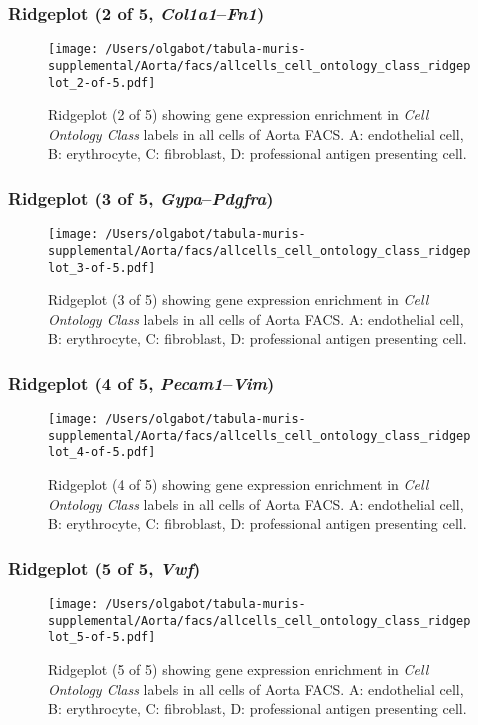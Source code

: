 \clearpage

\subsubsection{Ridgeplot (2 of 5, \emph{Col1a1}--\emph{Fn1})}
\begin{figure}[h]
\centering
\texttt{[image: /Users/olgabot/tabula-muris-supplemental/Aorta/facs/allcells\_cell\_ontology\_class\_ridgeplot\_2-of-5.pdf]}

\caption{ Ridgeplot (2 of 5)  showing gene expression enrichment in \emph{Cell Ontology Class} labels in all cells of Aorta FACS. A: endothelial cell, B: erythrocyte, C: fibroblast, D: professional antigen presenting cell.}
\end{figure}


\clearpage

\subsubsection{Ridgeplot (3 of 5, \emph{Gypa}--\emph{Pdgfra})}
\begin{figure}[h]
\centering
\texttt{[image: /Users/olgabot/tabula-muris-supplemental/Aorta/facs/allcells\_cell\_ontology\_class\_ridgeplot\_3-of-5.pdf]}

\caption{ Ridgeplot (3 of 5)  showing gene expression enrichment in \emph{Cell Ontology Class} labels in all cells of Aorta FACS. A: endothelial cell, B: erythrocyte, C: fibroblast, D: professional antigen presenting cell.}
\end{figure}


\clearpage

\subsubsection{Ridgeplot (4 of 5, \emph{Pecam1}--\emph{Vim})}
\begin{figure}[h]
\centering
\texttt{[image: /Users/olgabot/tabula-muris-supplemental/Aorta/facs/allcells\_cell\_ontology\_class\_ridgeplot\_4-of-5.pdf]}

\caption{ Ridgeplot (4 of 5)  showing gene expression enrichment in \emph{Cell Ontology Class} labels in all cells of Aorta FACS. A: endothelial cell, B: erythrocyte, C: fibroblast, D: professional antigen presenting cell.}
\end{figure}


\clearpage

\subsubsection{Ridgeplot (5 of 5, \emph{Vwf})}
\begin{figure}[h]
\centering
\texttt{[image: /Users/olgabot/tabula-muris-supplemental/Aorta/facs/allcells\_cell\_ontology\_class\_ridgeplot\_5-of-5.pdf]}

\caption{ Ridgeplot (5 of 5)  showing gene expression enrichment in \emph{Cell Ontology Class} labels in all cells of Aorta FACS. A: endothelial cell, B: erythrocyte, C: fibroblast, D: professional antigen presenting cell.}
\end{figure}


